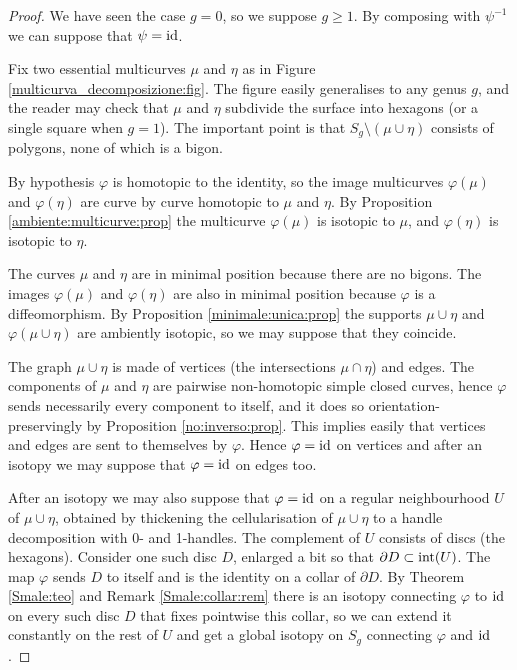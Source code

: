 \begin{proof}
We have seen the case $g=0$, so we suppose $g\geqslant 1$. By composing with $\psi^{-1}$ we can suppose that $\psi = {\rm id}$.

Fix two essential multicurves $\mu$ and $\eta$ as in Figure \ref{multicurva_decomposizione:fig}. The figure easily generalises to any genus $g$, and the reader may check that $\mu$ and $\eta$ subdivide the surface into hexagons (or a single square when $g=1$). The important point is that $S_g \setminus (\mu \cup \eta)$ consists of polygons, none of which is a bigon.

By hypothesis $\varphi$ is homotopic to the identity, so the image multicurves $\varphi(\mu)$ and $\varphi(\eta)$ are curve by curve homotopic to $\mu$ and $\eta$. By Proposition \ref{ambiente:multicurve:prop} the multicurve $\varphi(\mu)$ is isotopic to $\mu$, and $\varphi(\eta)$ is isotopic to $\eta$.

The curves $\mu$ and $\eta$ are in minimal position because there are no bigons. The images $\varphi(\mu)$ and $\varphi(\eta)$ are also in minimal position because $\varphi$ is a diffeomorphism. 
By Proposition \ref{minimale:unica:prop} the supports $\mu \cup \eta$ and $\varphi(\mu\cup \eta)$ are ambiently isotopic, so we may suppose that they coincide.

The graph $\mu\cup \eta$ is made of vertices (the intersections $\mu\cap \eta$) and edges. The components of $\mu$ and $\eta$ are pairwise non-homotopic simple closed curves, hence $\varphi$ sends necessarily every component to itself, and it does so orientation-preservingly by Proposition \ref{no:inverso:prop}. This implies easily that vertices and edges are sent to themselves by $\varphi$. Hence $\varphi={\rm id}$ on vertices and after an isotopy we may suppose that $\varphi={\rm id}$ on edges too. 

After an isotopy we may also suppose that $\varphi = {\rm id}$ on a regular neighbourhood $U$ of $\mu\cup\eta$, obtained by thickening the cellularisation of $\mu\cup\eta$ to a handle decomposition with 0- and 1-handles. The complement of $U$ consists of discs (the hexagons). Consider one such disc $D$, enlarged a bit so that $\partial D \subset {\rm int}(U)$. The map $\varphi$ sends $D$ to itself and is the identity on a collar of $\partial D$. By Theorem \ref{Smale:teo} and Remark \ref{Smale:collar:rem} there is an isotopy connecting $\varphi$ to ${\rm id}$ on every such disc $D$ that fixes pointwise this collar, so we can extend it constantly on the rest of $U$ and get a global isotopy on $S_g$ connecting $\varphi$ and ${\rm id}$.
\end{proof}


